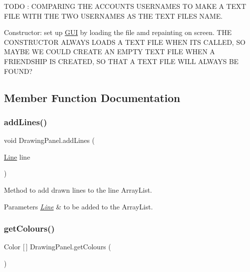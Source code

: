 T\+O\+DO \+: C\+O\+M\+P\+A\+R\+I\+NG T\+HE A\+C\+C\+O\+U\+N\+TS U\+S\+E\+R\+N\+A\+M\+ES TO M\+A\+KE A T\+E\+XT F\+I\+LE W\+I\+TH T\+HE T\+WO U\+S\+E\+R\+N\+A\+M\+ES AS T\+HE T\+E\+XT F\+I\+LE\textquotesingle{}S N\+A\+ME. 

Constructor\+: set up \hyperlink{class_g_u_i}{G\+UI} by loading the file amd repainting on screen. T\+HE C\+O\+N\+S\+T\+R\+U\+C\+T\+OR A\+L\+W\+A\+YS L\+O\+A\+DS A T\+E\+XT F\+I\+LE W\+H\+EN I\+TS C\+A\+L\+L\+ED, SO M\+A\+Y\+BE WE C\+O\+U\+LD C\+R\+E\+A\+TE AN E\+M\+P\+TY T\+E\+XT F\+I\+LE W\+H\+EN A F\+R\+I\+E\+N\+D\+S\+H\+IP IS C\+R\+E\+A\+T\+ED, SO T\+H\+AT A T\+E\+XT F\+I\+LE W\+I\+LL A\+L\+W\+A\+YS BE F\+O\+U\+ND?

\subsection{Member Function Documentation}
\mbox{\label{class_drawing_panel_abf082fafa7877579ae1bf1583e74cdd8}} 
\subsubsection{\texorpdfstring{add\+Lines()}{addLines()}}
{\footnotesize\ttfamily void Drawing\+Panel.\+add\+Lines (\begin{DoxyParamCaption}\item[{\hyperlink{class_line}{Line}}]{line }\end{DoxyParamCaption})}



Method to add drawn lines to the line Array\+List. 


\begin{DoxyParams}{Parameters}
{\em \hyperlink{class_line}{Line}} & to be added to the Array\+List. \\
\hline
\end{DoxyParams}
\mbox{\label{class_drawing_panel_a90f962e27cca561096b4d5a68fd69ac3}} 
\subsubsection{\texorpdfstring{get\+Colours()}{getColours()}}
{\footnotesize\ttfamily Color \mbox{[}$\,$\mbox{]} Drawing\+Panel.\+get\+Colours (\begin{DoxyParamCaption}{ }\end{DoxyParamCaption})}



